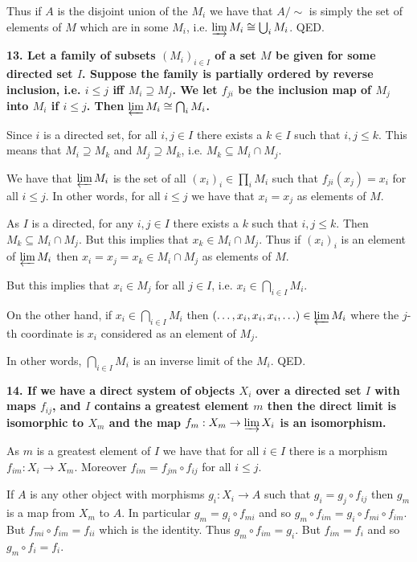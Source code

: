 \documentclass[12pt]{article}
\begin{document}
Thus if $A$ is the disjoint union of the $M_i$ we have that $A/\sim$ is simply the set of elements of $M$ which are in some $M_i$, i.e. $\varinjlim M_i \cong \bigcup_i M_i$. QED.

\textbf{13. Let a family of subsets $(M_i)_{i\in I}$ of a set $M$ be given for some directed set $I$. Suppose the family is  partially ordered by reverse inclusion, i.e. $i \leq j$ iff $M_i \supseteq M_j$. We let $f_{ji}$ be the inclusion map of $M_j$ into $M_i$ if $i \leq j$. Then $\varprojlim M_i \cong \bigcap_i M_i$.}

Since $i$ is a directed set, for all $i, j \in I$ there exists a $k \in I$ such that $i, j \leq k$. This means that $M_i \supseteq M_k$ and $M_j \supseteq M_k$, i.e. $M_k \subseteq M_i \cap M_j$.

We have that $\varprojlim M_i$ is the set of all $(x_i)_i \in \prod_i M_i$ such that $f_{ji}(x_j) = x_i$ for all $i \leq j$. In other words, for all $i \leq j$ we have that $x_i = x_j$ as elements of $M$.

As $I$ is a directed, for any $i, j \in I$ there exists a $k$ such that $i, j \leq k$. Then $M_k \subseteq M_i\cap M_j$. But this implies that $x_k \in M_i\cap M_j$. Thus if $(x_i)_i$ is an element of $\varprojlim M_i$ then $x_i = x_j = x_k \in M_i\cap M_j$ as elements of $M$.

But this implies that $x_i \in M_j$ for all $j \in I$, i.e. $x_i \in \bigcap_{i\in I} M_i$.

On the other hand, if $x_i \in \bigcap_{i\in I} M_i$ then $(\ldots, x_i, x_i, x_i, \ldots) \in \varprojlim M_i$ where the $j$-th coordinate is $x_i$ considered as an element of $M_j$.

In other words, $\bigcap_{i \in I} M_i$ is an inverse limit of the $M_i$. QED.

\textbf{14. If we have a direct system of objects $X_i$ over a directed set $I$ with maps $f_{ij}$, and $I$ contains a greatest element $m$ then the direct limit is isomorphic to $X_m$ and the map $f_m : X_m \to \varinjlim X_i$ is an isomorphism.}

As $m$ is a greatest element of $I$ we have that for all $i \in I$ there is a morphism $f_{im} : X_i \to X_m$. Moreover $f_{im} = f_{jm}\circ f_{ij}$ for all $i \leq j$.

If $A$ is any other object with morphisms $g_i : X_i \to A$ such that $g_i = g_j\circ f_{ij}$ then $g_m$ is a map from $X_m$ to $A$. In particular $g_m = g_i\circ f_{mi}$ and so $g_m\circ f_{im} = g_i\circ f_{mi}\circ f_{im}$. But $f_{mi}\circ f_{im} = f_{ii}$ which is the identity. Thus $g_m\circ f_{im} = g_i$. But $f_{im} = f_i$ and so $g_m\circ f_i = f_i$.
\end{document}
